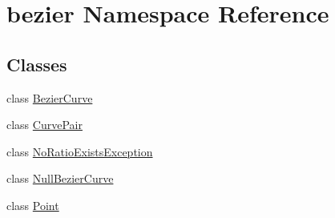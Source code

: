 \hypertarget{namespacebezier}{}\section{bezier Namespace Reference}
\label{namespacebezier}
\subsection*{Classes}
\begin{DoxyCompactItemize}
\item 
class \hyperlink{classbezier_1_1_bezier_curve}{Bezier\+Curve}
\item 
class \hyperlink{classbezier_1_1_curve_pair}{Curve\+Pair}
\item 
class \hyperlink{classbezier_1_1_no_ratio_exists_exception}{No\+Ratio\+Exists\+Exception}
\item 
class \hyperlink{classbezier_1_1_null_bezier_curve}{Null\+Bezier\+Curve}
\item 
class \hyperlink{classbezier_1_1_point}{Point}
\end{DoxyCompactItemize}
